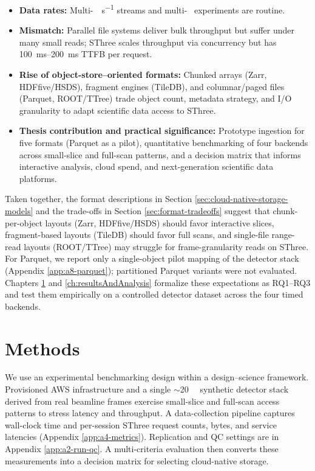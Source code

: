 \documentclass[nomenclature, english, bibtex]{kththesis}
\numberwithin{listing}{chapter}
\begin{document}
\begin{itemize}
  \item \textbf{Data rates:} Multi-\si{\giga\byte\per\second} streams and multi-\si{\tera\byte} experiments are routine.
  \item \textbf{Mismatch:} Parallel file systems deliver bulk throughput but suffer under many small reads; \gls{SThree} scales throughput via concurrency but has \SIrange{100}{200}{\milli\second} TTFB per request.
  \item \textbf{Rise of object-store–oriented formats:} Chunked arrays (Zarr, \gls{HDFfive}/\gls{HSDS}), fragment engines (TileDB), and columnar/paged files (Parquet, \gls{ROOT}/\gls{TTree}) trade object count, metadata strategy, and I/O granularity to adapt scientific data access to \gls{SThree}.
  \item \textbf{Thesis contribution and practical significance:} Prototype ingestion for five formats (Parquet as a pilot), quantitative benchmarking of four backends across small-slice and full-scan patterns, and a decision matrix that informs interactive analysis, cloud spend, and next-generation scientific data platforms.
\end{itemize}

Taken together, the format descriptions in Section \ref{sec:cloud-native-storage-models} and the trade-offs in Section \ref{sec:format-tradeoffs} suggest that chunk-per-object layouts (Zarr, \gls{HDFfive}/\gls{HSDS}) should favor interactive slices, fragment-based layouts (TileDB) should favor full scans, and single-file range-read layouts (\gls{ROOT}/\gls{TTree}) may struggle for frame-granularity reads on \gls{SThree}. For Parquet, we report only a single-object pilot mapping of the detector stack (Appendix \ref{app:a8-parquet}); partitioned Parquet variants were not evaluated. Chapters \ref{ch:methods} and \ref{ch:resultsAndAnalysis} formalize these expectations as RQ1–RQ3 and test them empirically on a controlled detector dataset across the four timed backends.















\cleardoublepage
\chapter{Methods}
\label{ch:methods}
We use an experimental benchmarking design within a design–science framework. Provisioned \gls{AWS} infrastructure and a single \(\sim\)\SI{20}{\gibi\byte} synthetic detector stack derived from real beamline frames exercise small-slice and full-scan access patterns to stress latency and throughput. A data-collection pipeline captures wall-clock time and per-session \gls{SThree} request counts, bytes, and service latencies (Appendix \ref{app:a4-metrics}). Replication and QC settings are in Appendix \ref{app:a2-run-qc}. A multi-criteria evaluation then converts these measurements into a decision matrix for selecting cloud-native storage.
\end{document}
